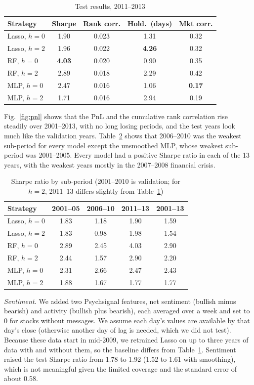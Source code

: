 \documentclass[conference]{IEEEtran}
\begin{document}
\begin{table}[t]
\centering
\small
\caption{Test results, 2011--2013}
\label{tab:test}
\begin{tabular}{lcccc}
\toprule
Strategy & Sharpe & Rank corr. & Hold.\ (days) & Mkt corr.\\
\midrule
Lasso, $h=0$ & 1.90 & 0.023 & 1.31 & 0.32\\
Lasso, $h=2$ & 1.96 & 0.022 & \textbf{4.26} & 0.32\\
RF, $h=0$ & \textbf{4.03} & 0.020 & 0.90 & 0.35\\
RF, $h=2$ & 2.89 & 0.018 & 2.29 & 0.42\\
MLP, $h=0$ & 2.47 & 0.016 & 1.06 & \textbf{0.17}\\
MLP, $h=2$ & 1.71 & 0.016 & 2.94 & 0.19\\
\bottomrule
\end{tabular}
\end{table}

Fig.~\ref{fig:pnl} shows that the PnL and the cumulative rank correlation rise steadily over 2001--2013, with no long losing periods, and the test years look much like the validation years. Table~\ref{tab:sub} shows that 2006--2010 was the weakest sub-period for every model except the unsmoothed MLP, whose weakest sub-period was 2001--2005. Every model had a positive Sharpe ratio in each of the 13 years, with the weakest years mostly in the 2007--2008 financial crisis.

\begin{table}[t]
\centering
\small
\caption{Sharpe ratio by sub-period (2001--2010 is validation; for $h=2$, 2011--13 differs slightly from Table~\ref{tab:test})}
\label{tab:sub}
\begin{tabular}{lcccc}
\toprule
Strategy & 2001--05 & 2006--10 & 2011--13 & 2001--13\\
\midrule
Lasso, $h=0$ & 1.83 & 1.18 & 1.90 & 1.59\\
Lasso, $h=2$ & 1.83 & 0.98 & 1.98 & 1.54\\
RF, $h=0$ & 2.89 & 2.45 & 4.03 & 2.90\\
RF, $h=2$ & 2.44 & 1.57 & 2.90 & 2.20\\
MLP, $h=0$ & 2.31 & 2.66 & 2.47 & 2.43\\
MLP, $h=2$ & 1.88 & 1.67 & 1.77 & 1.77\\
\bottomrule
\end{tabular}
\end{table}

\textit{Sentiment.} We added two Psychsignal features, net sentiment (bullish minus bearish) and activity (bullish plus bearish), each averaged over a week and set to 0 for stocks without messages. We assume each day's values are available by that day's close (otherwise another day of lag is needed, which we did not test). Because these data start in mid-2009, we retrained Lasso on up to three years of data with and without them, so the baseline differs from Table~\ref{tab:test}. Sentiment raised the test Sharpe ratio from 1.78 to 1.92 (1.52 to 1.61 with smoothing), which is not meaningful given the limited coverage and the standard error of about 0.58.
\end{document}
